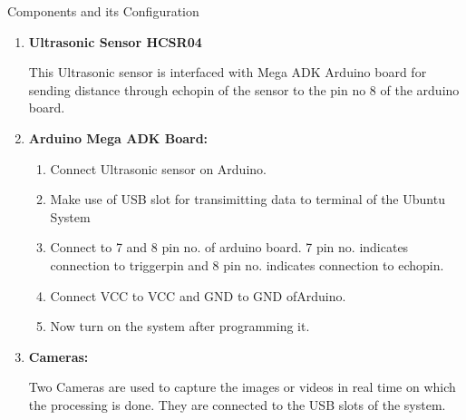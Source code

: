 \documentclass[14pt]{article}
\begin{document}
\break

\begin{center}
{\Huge Components and its Configuration}
\end{center}

\begin{enumerate}
	\item \textbf{{\large Ultrasonic Sensor HCSR04}}


{\raggedright
This Ultrasonic sensor is interfaced with Mega ADK Arduino board for sending distance through echopin of the sensor to the pin no 8 of the arduino board.
}
	\item \textbf{{\large Arduino Mega ADK Board:}}
	\begin{enumerate}
	\item Connect Ultrasonic sensor on Arduino.
	\item Make use of USB slot for transimitting data to terminal of the Ubuntu System
	\item Connect to 7 and 8 pin no. of arduino board. 7 pin no. indicates connection to triggerpin and 8 pin no. indicates connection to echopin.
	\item Connect VCC to VCC and GND to GND ofArduino.
	\item Now turn on the system after programming it.
\end{enumerate}


	\item \textbf{{\large Cameras:}}


Two Cameras are used to capture the images or videos in real time on which the processing is done. They are connected to the USB slots of the system.
\end{enumerate}

\break
\end{document}
